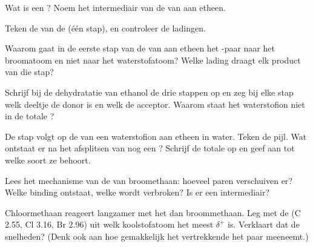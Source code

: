 \begin{exercise}[$\star$]\label{exo:g12:curly-arrows:5}
Wat is een ? Noem het intermediair van de  van
 aan etheen.
\end{exercise}

\begin{exercise}[$\star\star$]\label{exo:g12:curly-arrows:6}
Teken de  van de 
 (één stap), en controleer de ladingen.
\end{exercise}

\begin{exercise}[$\star\star$]\label{exo:g12:curly-arrows:7}
Waarom gaat in de eerste stap van de  van  aan etheen het
-paar naar het broomatoom en niet naar het waterstofatoom?
Welke lading draagt elk product van die stap?
\end{exercise}

\begin{exercise}[$\star\star$]\label{exo:g12:curly-arrows:8}
Schrijf bij de dehydratatie van ethanol de drie stappen op en zeg bij
elke stap welk deeltje de donor is en welk de acceptor. Waarom staat het
waterstofion niet in de totale ?
\end{exercise}

\begin{exercise}[$\star\star$]\label{exo:g12:curly-arrows:9}
De stap  volgt op de
 van een waterstofion aan etheen in water. Teken de pijl. Wat
ontstaat er na het afsplitsen van nog een ? Schrijf de totale
 op en geef aan tot welke soort ze behoort.
\end{exercise}

\begin{exercise}[$\star\star$]\label{exo:g12:curly-arrows:10}
Lees het mechanisme van de  van broomethaan: hoeveel paren
verschuiven er? Welke binding ontstaat, welke wordt verbroken? Is er een
intermediair?
\end{exercise}

\begin{exercise}[$\star\star$]\label{exo:g12:curly-arrows:11}
Chloormethaan reageert langzamer met het  dan
broommethaan. Leg met de  (C 2.55, Cl 3.16, Br
2.96) uit welk koolstofatoom het meest $\delta^+$ is. Verklaart dat de
snelheden? (Denk ook aan hoe gemakkelijk het vertrekkende  het paar
meeneemt.)
\end{exercise}

